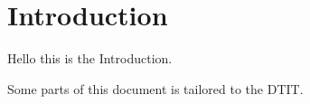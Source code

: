 \section{Introduction}

Hello this is the Introduction.\autocite{DTInternal2025}

Some parts of this document is tailored to the \gls{DTIT}.
